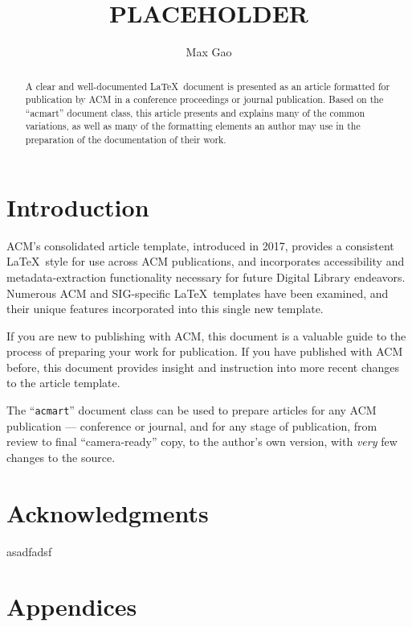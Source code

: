 \documentclass[manuscript,nonacm]{acmart}
\begin{document}
\title{PLACEHOLDER}
\author{Max Gao}

\begin{abstract}
  A clear and well-documented \LaTeX\ document is presented as an
  article formatted for publication by ACM in a conference proceedings
  or journal publication. Based on the ``acmart'' document class, this
  article presents and explains many of the common variations, as well
  as many of the formatting elements an author may use in the
  preparation of the documentation of their work.
\end{abstract}

\maketitle

\section{Introduction}
ACM's consolidated article template, introduced in 2017, provides a
consistent \LaTeX\ style for use across ACM publications, and
incorporates accessibility and metadata-extraction functionality
necessary for future Digital Library endeavors. Numerous ACM and
SIG-specific \LaTeX\ templates have been examined, and their unique
features incorporated into this single new template.

If you are new to publishing with ACM, this document is a valuable
guide to the process of preparing your work for publication. If you
have published with ACM before, this document provides insight and
instruction into more recent changes to the article template.

The ``\verb|acmart|'' document class can be used to prepare articles
for any ACM publication --- conference or journal, and for any stage
of publication, from review to final ``camera-ready'' copy, to the
author's own version, with {\itshape very} few changes to the source.

\section{Acknowledgments}
asadfadsf

\section{Appendices}
\end{document}
